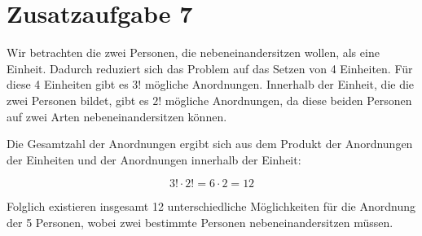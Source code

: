 \documentclass{article}
\begin{document}
\section*{Zusatzaufgabe 7}

Wir betrachten die zwei Personen, die nebeneinandersitzen wollen, als eine Einheit. Dadurch reduziert sich das Problem auf das Setzen von 4 Einheiten. Für diese 4 Einheiten gibt es \(3!\) mögliche Anordnungen. Innerhalb der Einheit, die die zwei Personen bildet, gibt es \(2!\) mögliche Anordnungen, da diese beiden Personen auf zwei Arten nebeneinandersitzen können.

Die Gesamtzahl der Anordnungen ergibt sich aus dem Produkt der Anordnungen der Einheiten und der Anordnungen innerhalb der Einheit:

\[
	3! \cdot 2! = 6 \cdot 2 = 12
\]

Folglich existieren insgesamt 12 unterschiedliche Möglichkeiten für die Anordnung der 5 Personen, wobei zwei bestimmte Personen nebeneinandersitzen müssen.
\end{document}
